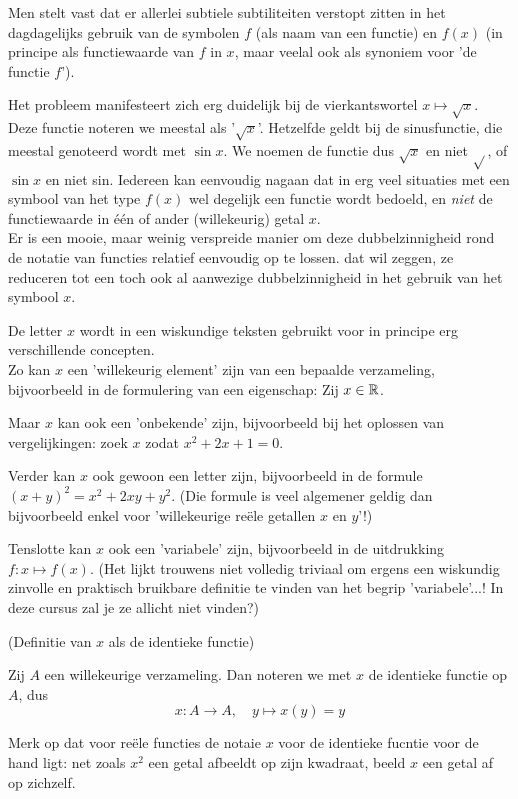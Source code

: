 \documentclass{ximera}
\begin{document}
\begin{uitweiding}

Men stelt vast dat er allerlei subtiele subtiliteiten verstopt zitten in het dagdagelijks gebruik van de symbolen $f$ (als naam van een functie) en $f(x)$ (in principe als functiewaarde van $f$ in $x$, maar veelal ook als synoniem voor 'de functie $f$'). 

Het probleem manifesteert zich erg duidelijk bij de vierkantswortel $x\mapsto \sqrt{x}$. Deze functie noteren we meestal als '$\sqrt{x}$'. Hetzelfde geldt bij de sinusfunctie, die meestal genoteerd wordt met $\sin x$. We noemen de functie dus $\sqrt{x}$ en niet $\sqrt{}$, of  $\sin x$ en niet sin. Iedereen kan eenvoudig nagaan dat in erg veel situaties met een symbool van het type $f(x)$ wel degelijk een functie wordt bedoeld, en \textit{niet} de functiewaarde in één of ander (willekeurig) getal $x$.
\\

Er is een mooie, maar weinig verspreide manier om deze dubbelzinnigheid rond de notatie van functies relatief eenvoudig op te lossen. dat wil zeggen, ze reduceren tot een toch ook al aanwezige dubbelzinnigheid in het gebruik van het symbool $x$. 

De letter $x$ wordt in een wiskundige teksten gebruikt voor in principe erg verschillende concepten. 
\\

Zo kan $x$ een 'willekeurig element' zijn van een bepaalde verzameling, bijvoorbeeld in de formulering van een eigenschap: Zij $x\in\mathbb{R}$.

Maar $x$ kan ook een 'onbekende' zijn, bijvoorbeeld bij het oplossen van vergelijkingen: zoek $x$ zodat $x^2+2x+1=0$. 

Verder kan $x$ ook gewoon een letter zijn, bijvoorbeeld in de formule $(x+y)^2 = x^2+2xy+y^2$. (Die formule is veel algemener geldig dan bijvoorbeeld enkel voor 'willekeurige reële getallen $x$ en $y$'!)

Tenslotte kan $x$ ook een 'variabele' zijn, bijvoorbeeld in de uitdrukking $f:x\mapsto f(x)$. (Het lijkt trouwens niet volledig triviaal om ergens een wiskundig zinvolle en praktisch bruikbare definitie te vinden van het begrip 'variabele'...! In deze cursus zal je ze allicht niet vinden?)


\begin{definition} (Definitie van $x$ als de identieke functie)
    
    Zij $A$ een willekeurige verzameling. Dan noteren we met $x$ de identieke functie op $A$, dus
    $$
    x:A \to A,\quad y \mapsto x(y) = y
    $$
\end{definition}
Merk op dat voor reële functies de notaie $x$ voor de identieke fucntie voor de hand ligt: net zoals $x^2$ een getal afbeeldt op zijn kwadraat, beeld $x$ een getal af op zichzelf.


\end{uitweiding}
\end{document}
